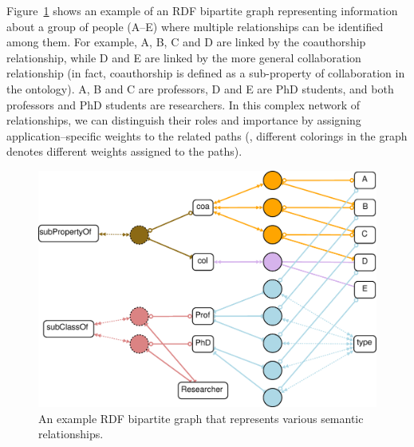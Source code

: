 \begin{myexp}
Figure~\ref{fig:hypergraph_mining-comp} shows an example of an RDF bipartite graph representing information about a group of people (A--E) where multiple relationships can be identified among them. For example, A, B, C and D are linked by the coauthorship relationship, while D and E are linked by the more general collaboration relationship (in fact, coauthorship is defined as a sub-property of collaboration in the ontology). A, B and C are professors, D and E are PhD students, and both professors and PhD students are researchers. In this complex network of relationships, we can distinguish their roles and importance by assigning application--specific weights to the related paths (\eg, different colorings in the graph denotes different weights assigned to the paths). %
\end{myexp}

\begin{figure}[tbh]
\begin{center}
\includegraphics[width=.65\textwidth]{fig/hypergraph_mining-comp.eps}
\end{center}
\caption[An example RDF bipartite graph that represents various semantic relationships]{\label{fig:hypergraph_mining-comp} An example RDF bipartite graph that represents various semantic relationships.}
\end{figure}
